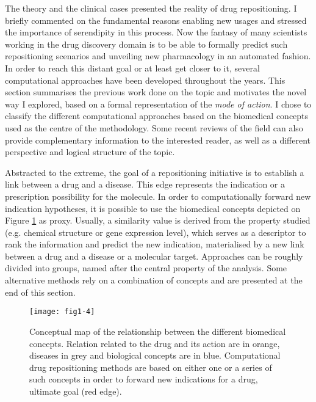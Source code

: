 The theory and the clinical cases presented the reality of drug repositioning. I briefly commented on the fundamental reasons enabling new usages and stressed the importance of serendipity in this process. Now the fantasy of many scientists working in the drug discovery domain is to be able to formally predict such repositioning scenarios and unveiling new pharmacology in an automated fashion. In order to reach this distant goal or at least get closer to it, several computational approaches have been developed throughout the years. This section summarises the previous work done on the topic and motivates the novel way I explored, based on a formal representation of the \emph{mode of action}. I chose to classify the different computational approaches based on the biomedical concepts used as the centre of the methodology. Some recent reviews \citep{ashburn2004drug} \citep{dudley2011exploiting} \citep{hurle2013computational} of the field can also provide complementary information to the interested reader, as well as a different perspective and logical structure of the topic.

Abstracted to the extreme, the goal of a repositioning initiative is to establish a link between a drug and a disease. This edge represents the indication or a prescription possibility for the molecule. In order to computationally forward new indication hypotheses, it is possible to use the biomedical concepts depicted on Figure \ref{fig1-4} as proxy. Usually, a similarity value is derived from the property studied (e.g. chemical structure or gene expression level), which serves as a descriptor to rank the information and predict the new indication, materialised by a new link between a drug and a disease or a molecular target. Approaches can be roughly divided into groups, named after the central property of the analysis. Some alternative methods rely on a combination of concepts and are presented at the end of this section.

\begin{figure}[ht]
    \centering
    \texttt{[image: fig1-4]}
    \caption{Conceptual map of the relationship between the different biomedical concepts. Relation related to the drug and its action are in orange, diseases in grey and biological concepts are in blue. Computational drug repositioning methods are based on either one or a series of such concepts in order to forward new indications for a drug, ultimate goal (red edge).}
    \label{fig1-4}
\end{figure}

